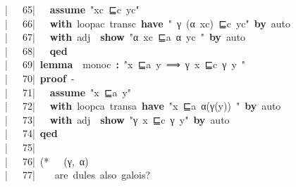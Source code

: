 \documentclass{article}
\newcommand{\syntaxCOMMENTA}[1]{\textcolor[rgb]{0.8,0.0,0.0}{#1}}
\newcommand{\syntaxKEYWORDA}[1]{\textcolor[rgb]{0.0,0.4,0.6}{\textbf{#1}}}
\newcommand{\syntaxKEYWORDC}[1]{\textcolor[rgb]{0.0,0.6,1.0}{\textbf{#1}}}
\newcommand{\syntaxLITERALA}[1]{\textcolor[rgb]{1.0,0.0,0.8}{#1}}
\newcommand{\syntaxOPERATOR}[1]{\textcolor[rgb]{0.0,0.0,0.0}{\textbf{#1}}}
\newcommand{\syntaxCOMMENTA}[1]{\textcolor[rgb]{0.8,0.0,0.0}{#1}}
\newcommand{\syntaxKEYWORDA}[1]{\textcolor[rgb]{0.0,0.4,0.6}{\textbf{#1}}}
\newcommand{\syntaxKEYWORDC}[1]{\textcolor[rgb]{0.0,0.6,1.0}{\textbf{#1}}}
\newcommand{\syntaxLITERALA}[1]{\textcolor[rgb]{1.0,0.0,0.8}{#1}}
\newcommand{\syntaxOPERATOR}[1]{\textcolor[rgb]{0.0,0.0,0.0}{\textbf{#1}}}
\newcommand{\syntaxCOMMENTA}[1]{\textcolor[rgb]{0.8,0.0,0.0}{#1}}
\newcommand{\syntaxKEYWORDA}[1]{\textcolor[rgb]{0.0,0.4,0.6}{\textbf{#1}}}
\newcommand{\syntaxKEYWORDC}[1]{\textcolor[rgb]{0.0,0.6,1.0}{\textbf{#1}}}
\newcommand{\syntaxLITERALA}[1]{\textcolor[rgb]{1.0,0.0,0.8}{#1}}
\newcommand{\syntaxOPERATOR}[1]{\textcolor[rgb]{0.0,0.0,0.0}{\textbf{#1}}}
\newcommand{\syntaxCOMMENTA}[1]{\textcolor[rgb]{0.8,0.0,0.0}{\textbf{#1}}}
\newcommand{\syntaxKEYWORDA}[1]{\textcolor[rgb]{0.0,0.4,0.6}{#1}}
\newcommand{\syntaxKEYWORDC}[1]{\textcolor[rgb]{0.0,0.6,1.0}{#1}}
\newcommand{\syntaxLITERALA}[1]{\textcolor[rgb]{1.0,0.0,0.8}{\textbf{#1}}}
\newcommand{\syntaxOPERATOR}[1]{\textcolor[rgb]{0.0,0.0,0.0}{#1}}
\newcommand{\syntaxCOMMENTA}[1]{\textcolor[rgb]{0.8,0.0,0.0}{#1}}
\newcommand{\syntaxKEYWORDA}[1]{\textcolor[rgb]{0.0,0.4,0.6}{\textbf{#1}}}
\newcommand{\syntaxKEYWORDC}[1]{\textcolor[rgb]{0.0,0.6,1.0}{\textbf{#1}}}
\newcommand{\syntaxLITERALA}[1]{\textcolor[rgb]{1.0,0.0,0.8}{#1}}
\newcommand{\syntaxOPERATOR}[1]{\textcolor[rgb]{0.0,0.0,0.0}{\textbf{#1}}}
\newcommand{\syntaxCOMMENTA}[1]{\textcolor[rgb]{0.8,0.0,0.0}{#1}}
\newcommand{\syntaxKEYWORDA}[1]{\textcolor[rgb]{0.0,0.4,0.6}{\textbf{#1}}}
\newcommand{\syntaxKEYWORDC}[1]{\textcolor[rgb]{0.0,0.6,1.0}{\textbf{#1}}}
\newcommand{\syntaxLITERALA}[1]{\textcolor[rgb]{1.0,0.0,0.8}{#1}}
\newcommand{\syntaxOPERATOR}[1]{\textcolor[rgb]{0.0,0.0,0.0}{\textbf{#1}}}
\newcommand{\syntaxCOMMENTA}[1]{\textcolor[rgb]{0.0,0.0,0.0}{#1}}
\newcommand{\syntaxKEYWORDA}[1]{\textcolor[rgb]{0.0,0.0,0.0}{#1}}
\newcommand{\syntaxKEYWORDC}[1]{\textcolor[rgb]{0.0,0.0,0.0}{#1}}
\newcommand{\gutter}[1]{\textcolor[rgb]{0,0,0}{{|}#1}}
\newcommand{\gutterH}[1]{\textcolor[rgb]{1,0,0}{{|}#1}}
\begin{document}
\gutterH{\ \ \ 65{|}\ }{\ }{\ }\syntaxKEYWORDC{assume}{\ }\syntaxLITERALA{"xc{\ }⊑c{\ }yc"}{\ }\hspace*{\fill}\\
\gutter{\ \ \ 66{|}\ }{\ }{\ }\syntaxKEYWORDA{with}{\ }loopac{\ }transc{\ }\syntaxKEYWORDA{have}{\ }\syntaxLITERALA{"{\ }γ{\ }(α{\ }xc){\ }⊑c{\ }yc"}{\ }\syntaxKEYWORDA{by}{\ }auto\hspace*{\fill}\\
\gutter{\ \ \ 67{|}\ }{\ }{\ }\syntaxKEYWORDA{with}{\ }adj{\ }{\ }\syntaxKEYWORDC{show}{\ }\syntaxLITERALA{"α{\ }xc{\ }⊑a{\ }α{\ }yc{\ }"}{\ }\syntaxKEYWORDA{by}{\ }auto\hspace*{\fill}\\
\gutter{\ \ \ 68{|}\ }{\ }{\ }\syntaxKEYWORDA{qed}\hspace*{\fill}\\
\gutter{\ \ \ 69{|}\ }\syntaxKEYWORDA{lemma}{\ }{\ }monoc{\ }\syntaxOPERATOR{:}{\ }\syntaxLITERALA{"x{\ }⊑a{\ }y{\ }⟹{\ }γ{\ }x{\ }⊑c{\ }γ{\ }y{\ }"}\hspace*{\fill}\\
\gutterH{\ \ \ 70{|}\ }\syntaxKEYWORDA{proof}{\ }{-}\hspace*{\fill}\\
\gutter{\ \ \ 71{|}\ }{\ }{\ }\syntaxKEYWORDC{assume}{\ }\syntaxLITERALA{"x{\ }⊑a{\ }y"}{\ }\hspace*{\fill}\\
\gutter{\ \ \ 72{|}\ }{\ }{\ }\syntaxKEYWORDA{with}{\ }loopca{\ }transa{\ }\syntaxKEYWORDA{have}{\ }\syntaxLITERALA{"x{\ }⊑a{\ }α(γ(y)){\ }"}{\ }\syntaxKEYWORDA{by}{\ }auto\hspace*{\fill}\\
\gutter{\ \ \ 73{|}\ }{\ }{\ }\syntaxKEYWORDA{with}{\ }adj{\ }{\ }\syntaxKEYWORDC{show}{\ }\syntaxLITERALA{"γ{\ }x{\ }⊑c{\ }γ{\ }y"}{\ }\syntaxKEYWORDA{by}{\ }auto\hspace*{\fill}\\
\gutter{\ \ \ 74{|}\ }\syntaxKEYWORDA{qed}\hspace*{\fill}\\
\gutterH{\ \ \ 75{|}\ }\hspace*{\fill}\\
\gutter{\ \ \ 76{|}\ }\syntaxCOMMENTA{(*{\ }{\ }{\ }(γ,{\ }α){\ }}\hspace*{\fill}\\
\gutter{\ \ \ 77{|}\ }\syntaxCOMMENTA{{\ }{\ }{\ }are{\ }dules{\ }also{\ }galois?{\ }{\ }}\hspace*{\fill}\\
\end{document}
